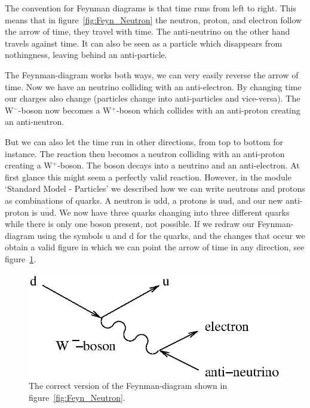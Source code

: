 \documentclass[12pt,a4paper]{article}
\numberwithin{equation}{section}
\numberwithin{figure}{section}
\numberwithin{table}{section}
\begin{document}
The convention for Feynman diagrams is that time runs from left to right. This means that in figure~\ref{fig:Feyn_Neutron} the neutron, proton, and electron follow the arrow of time, they travel with time. The anti-neutrino on the other hand travels against time. It can also be seen as a particle which disappears from nothingness, leaving behind an anti-particle.

The Feynman-diagram works both ways, we can very easily reverse the arrow of time. Now we have an neutrino colliding with an anti-electron. By changing time our charges also change (particles change into anti-particles and vice-versa). The W$^-$-boson now becomes a W$^+$-boson which collides with an anti-proton creating an anti-neutron.

But we can also let the time run in other directions, from top to bottom for instance. The reaction then becomes a neutron colliding with an anti-proton creating a W$^+$-boson. The boson decays into a neutrino and an anti-electron. At first glance this might seem a perfectly valid reaction. However, in the module `Standard Model - Particles' we described how we can write neutrons and protons as combinations of quarks. A neutron is udd, a protons is uud, and our new anti-proton is $\overline{\mbox{uud}}$. We now have three quarks changing into three different quarks while there is only one boson present, not possible. If we redraw our Feynman-diagram using the symbols u and d for the quarks, and the changes that occur we obtain a valid figure in which we can point the arrow of time in any direction, see figure~\ref{fig:Feyn_Neutron2}.

\begin{figure}\begin{center}
\includegraphics[scale=1]{Feyn_Neutron2.eps}%
\caption{The correct version of the Feynman-diagram shown in figure~\ref{fig:Feyn_Neutron}.}\label{fig:Feyn_Neutron2}
\end{center}\end{figure}
\end{document}
